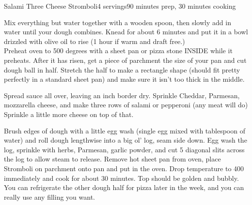 \documentclass[../Cookbook.tex]{subfiles}
\begin{document}
\begin{recipe}{Salami Three Cheese Stromboli}{4 servings}{90 minutes prep, 30 minutes cooking}

Mix everything but water together with a wooden spoon, then slowly add in water until your dough combines. Knead for about 6 minutes and put it in a bowl drizzled with olive oil to rise (1 hour if warm and draft free.)\\


Preheat oven to 500 degrees with a sheet pan or pizza stone INSIDE while it preheats.
After it has risen, get a piece of parchment the size of your pan and cut dough ball in half. Stretch the half to make a rectangle shape (should fit pretty perfectly in a standard sheet pan) and make sure it isn't too thick in the middle.

Spread sauce all over, leaving an inch border dry. Sprinkle Cheddar, Parmesan, mozzarella cheese, and make three rows of salami or pepperoni (any meat will do) Sprinkle a little more cheese on top of that.

Brush edges of dough with a little egg wash (single egg mixed with tablespoon of water) and roll dough lengthwise into a big ol' log, seam side down.
Egg wash the log, sprinkle with herbs, %
Parmesan, garlic powder, and cut 5 diagonal slits across the log to allow steam to release.
Remove hot sheet pan from oven, place Stromboli on parchment onto pan and put in the oven. Drop temperature to 400 immediately and cook for about 30 minutes. Top should be golden and bubbly.
You can refrigerate the other dough half for pizza later in the week, and you can really use any filling you want.

\end{recipe}
\end{document}
